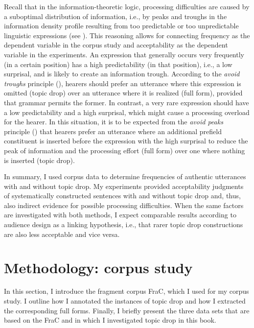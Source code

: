 Recall that in the information-theoretic  logic, processing difficulties are caused by a suboptimal distribution of information, i.e., by peaks and troughs in the information density profile resulting from too predictable  or too unpredictable linguistic expressions (see ).
This reasoning allows for connecting frequency as the dependent variable in the corpus study and acceptability as the dependent variable in the experiments.
An expression that generally occurs very frequently (in a certain position) has a high predictability  (in that position), i.e., a low surprisal, and is likely to create an information trough.
According to the \textit{avoid troughs} principle (), hearers should prefer an utterance where this expression is omitted (topic drop) over an utterance where it is realized (full form), provided that grammar permits the former.
In contrast, a very rare expression should have a low predictability  and a high surprisal, which might cause a processing overload for the hearer.
In this situation, it is to be expected from the \textit{avoid peaks} principle () that hearers prefer an utterance where an additional prefield constituent is inserted before the expression with the high surprisal to reduce the peak of information and the processing effort (full form) over one where nothing is inserted (topic drop).
 
In summary, I used corpus data to determine frequencies of authentic utterances with and without topic drop.
My experiments provided acceptability judgments of systematically constructed sentences with and without topic drop and, thus, also indirect evidence for possible processing difficulties. 
When the same factors are investigated with both methods, I expect comparable results according to audience design  as a linking hypothesis, i.e., that rarer topic drop constructions are also less acceptable and vice versa. 

\section{Methodology: corpus study}\label{sec:corpus}
In this section, I introduce the fragment corpus FraC, which I used for my corpus study.
I outline how I annotated the instances of topic drop and how I extracted the corresponding full forms.
Finally, I briefly present the three data sets that are based on the FraC and in which I investigated topic drop in this book.

